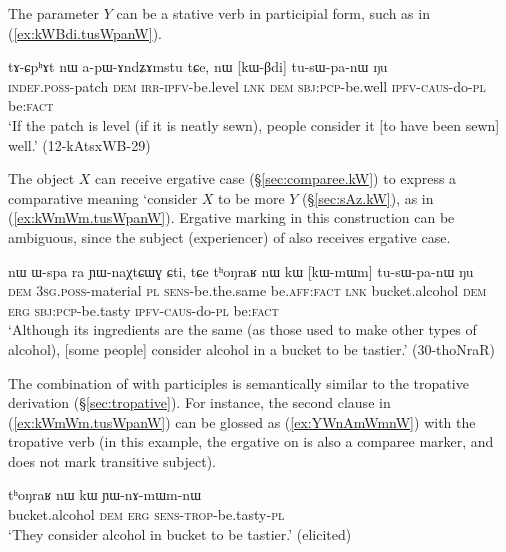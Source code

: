 The parameter $Y$ can be a stative verb in participial form, such as  in (\ref{ex:kWBdi.tusWpanW}).

\begin{exe}
\ex \label{ex:kWBdi.tusWpanW}
\gll tɤ-ɕpʰɤt nɯ a-pɯ-ɤndʑɤmstu tɕe, nɯ [kɯ-βdi] tu-sɯ-pa-nɯ ŋu \\
\textsc{indef}.\textsc{poss}-patch \textsc{dem} \textsc{irr}-\textsc{ipfv}-be.level \textsc{lnk} \textsc{dem} \textsc{sbj}:\textsc{pcp}-be.well \textsc{ipfv}-\textsc{caus}-do-\textsc{pl} be:\textsc{fact} \\
\glt `If the patch is level (if it is neatly sewn), people consider it [to have been sewn] well.' (12-kAtsxWB-29)
\end{exe}


The object $X$ can receive ergative case (§\ref{sec:comparee.kW}) to express a comparative meaning `consider $X$ to be more $Y$ (§\ref{sec:sAz.kW}), as in (\ref{ex:kWmWm.tusWpanW}). Ergative marking in this construction can be ambiguous, since the subject (experiencer) of  also receives ergative case.

\begin{exe}
\ex \label{ex:kWmWm.tusWpanW}
\gll nɯ ɯ-spa ra ɲɯ-naχtɕɯɣ ɕti, tɕe tʰoŋraʁ nɯ kɯ [kɯ-mɯm] tu-sɯ-pa-nɯ ŋu \\
\textsc{dem} \textsc{3sg}.\textsc{poss}-material \textsc{pl} \textsc{sens}-be.the.same be.\textsc{aff}:\textsc{fact} \textsc{lnk} bucket.alcohol \textsc{dem} \textsc{erg} \textsc{sbj}:\textsc{pcp}-be.tasty \textsc{ipfv}-\textsc{caus}-do-\textsc{pl} be:\textsc{fact} \\
\glt `Although its ingredients are the same (as those used to make other types of alcohol), [some people] consider alcohol in a bucket to be tastier.' (30-thoNraR)
\end{exe}

The combination of  with participles is semantically similar to the tropative  derivation (§\ref{sec:tropative}). For instance, the second clause in (\ref{ex:kWmWm.tusWpanW}) can be glossed as (\ref{ex:YWnAmWmnW}) with the tropative verb  (in this example, the ergative on  is also a comparee marker, and does not mark transitive subject).

\begin{exe}
\ex \label{ex:YWnAmWmnW}
\gll tʰoŋraʁ nɯ kɯ ɲɯ-nɤ-mɯm-nɯ \\
bucket.alcohol \textsc{dem} \textsc{erg} \textsc{sens}-\textsc{trop}-be.tasty-\textsc{pl} \\
\glt `They consider alcohol in bucket to be tastier.' (elicited)
\end{exe}



